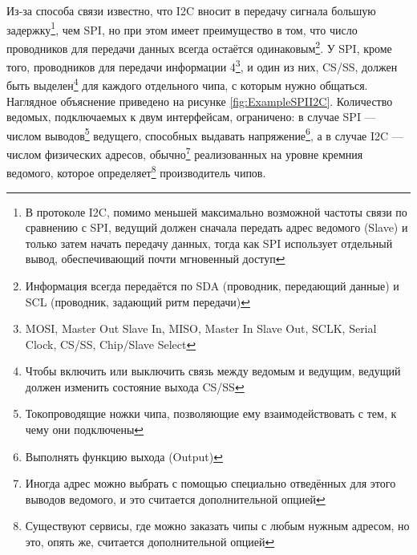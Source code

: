 \documentclass[a4paper, 10pt, final]{article} %
\begin{document}
    Из-за способа связи известно, что I2C вносит в передачу сигнала большую задержку\footnote{В протоколе I2C, помимо меньшей максимально возможной частоты связи по сравнению с SPI, ведущий должен сначала передать адрес ведомого (Slave) и только затем начать передачу данных, тогда как SPI использует отдельный вывод, обеспечивающий почти мгновенный доступ}, чем SPI, но при этом имеет преимущество в том, что число проводников для передачи данных всегда остаётся одинаковым\footnote{Информация всегда передаётся по SDA (проводник, передающий данные) и SCL (проводник, задающий ритм передачи)}.
    У SPI, кроме того, проводников для передачи информации 4\footnote{MOSI, Master Out Slave In, MISO, Master In Slave Out, SCLK, Serial Clock, CS/SS, Chip/Slave Select}, и один из них, CS/SS, должен быть выделен\footnote{Чтобы включить или выключить связь между ведомым и ведущим, ведущий должен изменить состояние выхода CS/SS} для каждого отдельного чипа, с которым нужно общаться.
    Наглядное объяснение приведено на рисунке \ref{fig:ExampleSPII2C}.
    Количество ведомых, подключаемых к двум интерфейсам, ограничено: в случае SPI --- числом выводов\footnote{Токопроводящие ножки чипа, позволяющие ему взаимодействовать с тем, к чему они подключены} ведущего, способных выдавать напряжение\footnote{Выполнять функцию выхода (Output)}, а в случае I2C --- числом физических адресов, обычно\footnote{Иногда адрес можно выбрать с помощью специально отведённых для этого выводов ведомого, и это считается дополнительной опцией} реализованных на уровне кремния ведомого, которое определяет\footnote{Существуют сервисы, где можно заказать чипы с любым нужным адресом, но это, опять же, считается дополнительной опцией} производитель чипов.
\end{document}
